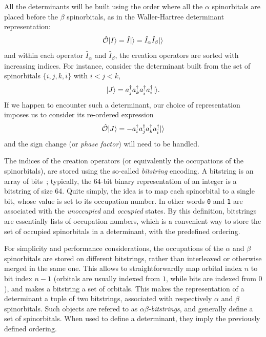 \documentclass[./thesis.tex]{subfiles}
\begin{document}
All the determinants will be built using the order where all the $\alpha$ spinorbitals are placed before the $\beta$ spinorbitals, as in the Waller-Hartree determinant representation:
\begin{equation}
\label{eq:spinpack}
{\hat{\mathcal{O}}} {\ket{I}} = \hat{I} {\ket{}} = \hat{I}_\alpha \hat{I}_\beta {\ket{}} 
\end{equation}
and within each operator $\hat{I}_\alpha$ and $\hat{I}_\beta$, the creation operators are sorted with increasing indices.
For instance, consider the determinant built from the set of spinorbitals $\{i,j,k,{\bar i} \}$ with $i<j<k$,
\begin{equation}
{\ket{J}} = a^\dagger_{j} a^\dagger_{k} a^\dagger_{\bar i} a^\dagger_{i} {\ket{}}.
\end{equation}
If we happen to encounter such a determinant, our choice of representation imposes us to consider its re-ordered expression
\begin{equation}
{\hat{\mathcal{O}}} {\ket{J}} = - a^\dagger_{i} a^\dagger_{j} a^\dagger_{k} a^\dagger_{\bar i} {\ket{}} 
\end{equation}
and the sign change (or \emph{phase factor}) will need to be handled.

The indices of the creation operators (or equivalently the
occupations of the spinorbitals), are stored using the so-called \emph{bitstring} encoding. A bitstring is an array of bits~; typically, the 64-bit binary representation of an integer is a bitstring of size 64.
Quite simply, the idea is to map each spinorbital to a single bit, whose value is set to its occupation number. In other words \texttt{0} and \texttt{1} are associated with the \emph{unoccupied} and \emph{occupied} states.
By this definition, bitstrings are essentially lists of occupation numbers, which is a convenient way to
store the set of occupied spinorbitals in a determinant, with the predefined ordering.

For simplicity and performance considerations, the occupations of the $\alpha$ and $\beta$ spinorbitals are stored on different bitstrings, rather than interleaved or otherwise merged in the same one. This allows to straightforwardly map orbital index $n$ to bit index $n-1$ (orbitals are usually indexed from $1$, while bits are indexed from $0$), and makes a bitstring a set of orbitals.
This makes the representation of a determinant a tuple of two bitstrings, associated with respectively $\alpha$ and $\beta$ spinorbitals. Such objects are refered to as \emph{$\alpha \beta$-bitstrings}, and generally define a set of spinorbitals. When used to define a determinant, they imply the previously defined ordering.
\end{document}
